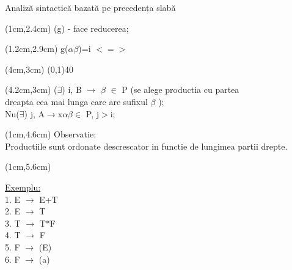 \documentclass[pdf]{beamer}
\begin{document}
\begin{frame}{Analiză sintactică bazată pe precedența slabă}

 \begin{textblock*}{15.8cm}(1cm,2.4cm)
\color{blue} {(g) - face reducerea;}
\end{textblock*}

\begin{textblock*}{15.8cm}(1.2cm,2.9cm)
\color{black} {g($\alpha\beta$)=i $<=>$  }
\end{textblock*}

\begin{textblock*}{15.8cm}(4cm,3cm)
\line(0,1){40}
\end{textblock*}
\begin{textblock*}{15.8cm}(4.2cm,3cm)
\color{black} {($\exists$) i, B $\rightarrow$ $\beta$ $\in$ P (se alege productia cu partea \\ dreapta cea mai lunga care are sufixul $\beta$ ); 
\\ Nu($\exists$) j, A$\rightarrow$x$\alpha\beta\in$ P, j$>$i;}
\end{textblock*}

\begin{textblock*}{16.9cm}(1cm,4.6cm)
\color{black} {Observatie:}
\\ \color{red} \small{Productiile sunt ordonate descrescator in functie de lungimea partii drepte.}
\end{textblock*}

\begin{textblock*}{16.9cm}(1cm,5.6cm)

\color{black} \underline {Exemplu:}
\\ 1. E $\rightarrow$ E+T
\\ 2. E $\rightarrow$ T
\\ 3. T $\rightarrow$ T*F
\\ 4. T $\rightarrow$ F
\\ 5. F $\rightarrow$ (E)
\\ 6. F $\rightarrow$ (a)
\end{textblock*}


\end{frame}
\end{document}
